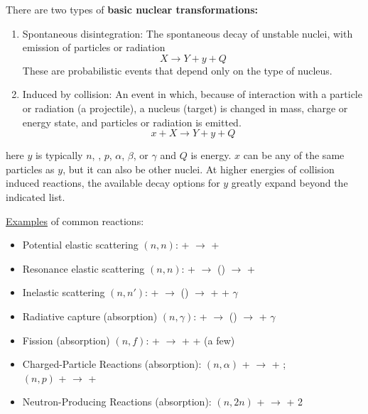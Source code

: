 \documentclass[12pt]{article}
\begin{document}
There are two types of \textbf{basic nuclear transformations:}
\begin{enumerate}
\item Spontaneous disintegration: The spontaneous decay of unstable nuclei, with emission of particles or radiation
\[X \rightarrow Y + y + Q\]
These are probabilistic events that depend only on the type of nucleus.

\item Induced by collision: An event in which, because of interaction with a particle or radiation (a projectile), a nucleus (target) is changed in mass, charge or energy state, and particles or radiation is
emitted.
\[x + X \rightarrow Y + y + Q\]
\end{enumerate}
here $y$ is typically $n$, , $p$, $\alpha$, $\beta$, or $\gamma$ and $Q$ is energy.
$x$ can be any of the same particles as $y$, but it can also be other nuclei.
At higher energies of collision induced reactions, the available decay options for $y$ greatly expand beyond the indicated list.

\underline{Examples} of common reactions:
\begin{itemize}
\item Potential elastic scattering $(n,n)$:  +  $\rightarrow$  + 

\item Resonance elastic scattering $(n,n)$:  +  $\rightarrow$ () $\rightarrow$  + 

\item Inelastic scattering $(n,n')$:  +  $\rightarrow$ () $\rightarrow$  +  + $\gamma$

\item Radiative capture (absorption) $(n,\gamma)$:  +  $\rightarrow$ () $\rightarrow$  + $\gamma$

\item Fission (absorption) $(n,f)$:  +  $\rightarrow$  +  + (a few)

\item Charged-Particle Reactions (absorption): $(n,\alpha)$  +  $\rightarrow$  + ; \\
\hspace*{17 em}$(n,p)$   +  $\rightarrow$  + 

\item Neutron-Producing Reactions (absorption): $(n,2n)$	  +  $\rightarrow$  + 2
\end{itemize}
\end{document}
